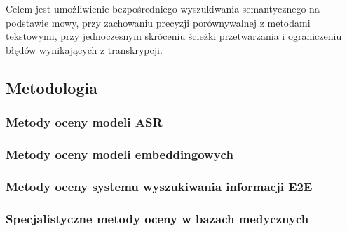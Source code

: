 Celem jest umożliwienie bezpośredniego wyszukiwania semantycznego na podstawie mowy, przy zachowaniu precyzji porównywalnej z metodami tekstowymi, przy jednoczesnym skróceniu ścieżki przetwarzania i ograniczeniu błędów wynikających z transkrypcji.

\subsection{Metodologia}

\subsubsection{Metody oceny modeli ASR}

\subsubsection{Metody oceny modeli embeddingowych}

\subsubsection{Metody oceny systemu wyszukiwania informacji E2E}

\subsubsection{Specjalistyczne metody oceny w bazach medycznych}

